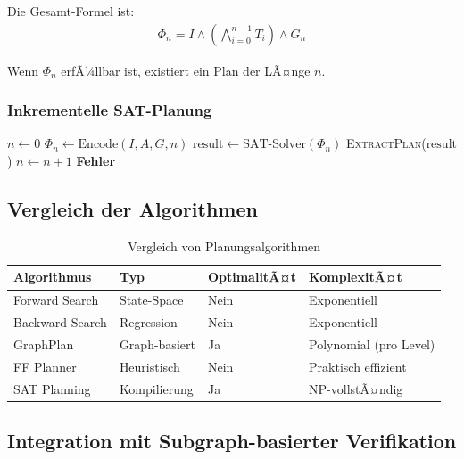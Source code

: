﻿\documentclass[a4paper,12pt]{article}
\theoremstyle{definition}
\begin{document}
Die Gesamt-Formel ist:
\begin{align}
\Phi_n = I \land \left(\bigwedge_{i=0}^{n-1} T_i\right) \land G_n
\end{align}

Wenn $\Phi_n$ erfÃ¼llbar ist, existiert ein Plan der LÃ¤nge $n$.

\subsubsection{Inkrementelle SAT-Planung}

\begin{algorithm}[H]
	\caption{SAT-basierte Planung}
	\begin{algorithmic}[1]
		\State $n \gets 0$
		\Wiederhole
		\State $\Phi_n \gets \text{Encode}(I, A, G, n)$
		\State $\text{result} \gets \text{SAT-Solver}(\Phi_n)$
		\State \Return \textsc{ExtractPlan}($\text{result}$)
		\EndeWenn
		\State $n \gets n + 1$
		\State \Return \textbf{Fehler}
		\EndProzedur
	\end{algorithmic}
\end{algorithm}

\subsection{Vergleich der Algorithmen}

\begin{table}[h]
	\centering
	\caption{Vergleich von Planungsalgorithmen}
	\label{tab:planner_comparison}
	\begin{tabular}{llll}
		\toprule
		Algorithmus & Typ & OptimalitÃ¤t & KomplexitÃ¤t \\
		\midrule
		Forward Search & State-Space & Nein & Exponentiell \\
		Backward Search & Regression & Nein & Exponentiell \\
		GraphPlan & Graph-basiert & Ja & Polynomial (pro Level) \\
		FF Planner & Heuristisch & Nein & Praktisch effizient \\
		SAT Planning & Kompilierung & Ja & NP-vollstÃ¤ndig \\
		\bottomrule
	\end{tabular}
\end{table}

\subsection{Integration mit Subgraph-basierter Verifikation}
\end{document}

